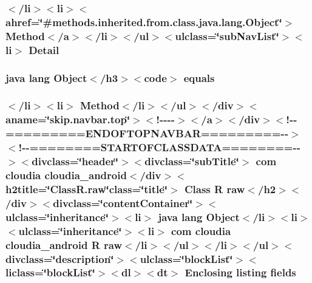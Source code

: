 \hypertarget{_r_8raw_8html_aed0df2ae11502bf9389ac3cf53b1c0f6}{
\subsubsection[{Detail}]{\setlength{\rightskip}{0pt plus 5cm}$<$/li$>$$<$li$>$$<$ahref=\char`\"{}\#methods.\-inherited.\-from.\-class.\-java.\-lang.\-Object\char`\"{}$>$ Method$<$/{\bf a}$>$$<$/li$>$$<$/ul$>$$<$ulclass=\char`\"{}sub\-Nav\-List\char`\"{}$>$$<$li$>$ Detail}}\label{_r_8raw_8html_aed0df2ae11502bf9389ac3cf53b1c0f6}
\hypertarget{_r_8raw_8html_a8974318cea585f72df717e0380ec7104}{
\subsubsection[{equals}]{\setlength{\rightskip}{0pt plus 5cm}java lang Object$<$/h3$>$$<$code$>$ equals}}\label{_r_8raw_8html_a8974318cea585f72df717e0380ec7104}
\hypertarget{_r_8raw_8html_a39771e0b2079a7f1c1b2cfc024bce4de}{
\subsubsection[{fields}]{\setlength{\rightskip}{0pt plus 5cm}$<$/li$>$$<$li$>$ Method$<$/li$>$$<$/ul$>$$<$/div$>$$<$aname=\char`\"{}skip.\-navbar.\-top\char`\"{}$>$$<$!-\/-\/-\/-\/$>$$<$/a$>$$<$/div$>$$<$!-\/-\/=========E\-N\-D\-O\-F\-T\-O\-P\-N\-A\-V\-B\-A\-R=========-\/-\/$>$$<$!-\/-\/========S\-T\-A\-R\-T\-O\-F\-C\-L\-A\-S\-S\-D\-A\-T\-A========-\/-\/$>$$<$divclass=\char`\"{}header\char`\"{}$>$$<$divclass=\char`\"{}sub\-Title\char`\"{}$>$ com cloudia cloudia\-\_\-android$<$/div$>$$<$h2title=\char`\"{}Class\-R.\-raw\char`\"{}class=\char`\"{}title\char`\"{}$>$ Class {\bf R} {\bf raw}$<$/h2$>$$<$/div$>$$<$divclass=\char`\"{}content\-Container\char`\"{}$>$$<$ulclass=\char`\"{}inheritance\char`\"{}$>$$<$li$>$ java lang Object$<$/li$>$$<$li$>$$<$ulclass=\char`\"{}inheritance\char`\"{}$>$$<$li$>$ com cloudia cloudia\-\_\-android {\bf R} {\bf raw}$<$/li$>$$<$/ul$>$$<$/li$>$$<$/ul$>$$<$divclass=\char`\"{}description\char`\"{}$>$$<$ulclass=\char`\"{}block\-List\char`\"{}$>$$<$liclass=\char`\"{}block\-List\char`\"{}$>$$<$dl$>$$<${\bf dt}$>$ Enclosing listing fields}}\label{_r_8raw_8html_a39771e0b2079a7f1c1b2cfc024bce4de}
